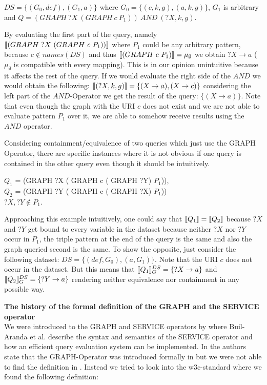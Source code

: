 \begin{example}
	$DS=\{(G_0,def), (G_1,a) \}$ where $G_0 = \{
	(c,k,g), (a,k,g) \}$, $G_1$ is arbitrary and  $Q = (GRAPH \ ?X  \ (GRAPH  \ c \  P_1)) \ AND \ (?X,k,g)$.
\end{example}

By evaluating the first part of the query, namely $\llbracket (GRAPH \ ?X  \ (GRAPH  \
c \  P_1)) \rrbracket$ where $P_1$ could be any arbitrary pattern, because $c \notin
names(DS)$ and thus $\llbracket (GRAPH \ c  \ P_1) \rrbracket = \mu_\emptyset$  we obtain $?X
\rightarrow a$ ($\mu_\emptyset$ is compatible with every mapping). This is in
our opinion unintuitive because it affects the rest of the query.
If we would evaluate the right side of the $AND$ we would obtain the following: $\llbracket(?X,k,g)\rrbracket = \{ (X \rightarrow a) , (X \rightarrow c) \}$ considering the
left part of the $AND$-Operator we get the result of the query: $\{ (X \rightarrow a )
\}$. Note that even though the graph with the URI $c$ does not exist and we are not able
to evaluate pattern $P_1$ over it, we are able to somehow receive results using
the $AND$ operator.
\bigskip

\noindent Considering containment/equivalence of two queries which just use the GRAPH
Operator, there are specific instances where it is not obvious if one query is contained in the other query even though it should be intuitively.

\begin{example}
	$Q_1$ = (GRAPH ?X ( GRAPH c ( GRAPH ?Y) $P_1$)),\\ 
	$Q_2$ = (GRAPH ?Y ( GRAPH c ( GRAPH ?X) $ P_1$))\\
	$?X,?Y \notin P_1$.
\end{example}

Approaching this example intuitively, one could say that $\llbracket Q_1 \rrbracket = \llbracket Q_2
\rrbracket$ because $?X$ and $?Y$ get bound to every variable in the dataset because neither
$?X$ nor $?Y$ occur in $P_1$, the triple pattern at the end
of the query is the same and also the graph queried second is the same. 
To show the opposite, just  consider the following dataset:
$DS=\{(def,G_0), (a,G_1)\}$. Note that the URI $c$ does not occur in the dataset.
But this means that $\llbracket Q_1 \rrbracket^{DS}_G = \{?X \rightarrow a\}$ and  $\llbracket Q_2
\rrbracket^{DS}_G = \{?Y \rightarrow a\}$ rendering neither equivalence nor containment
in any possible way.

\noindent\textbf{The history of the formal definition of the GRAPH and the SERVICE
operator}\\
We were introduced to the GRAPH and
SERVICE operators by \cite{BuilAranda20131} where Buil-Aranda et al.
describe the syntax and semantics of the SERVICE operator and how an efficient query
evaluation system can be implemented. In \cite{BuilAranda20131} the authors
state that the GRAPH-Operator was introduced formally
in \cite{perez2009semantics} but we were not able to find the definition in \cite{perez2009semantics}.
Instead we tried to look into the w3c-standard\cite{w3standard} 
where we found the following definition:

